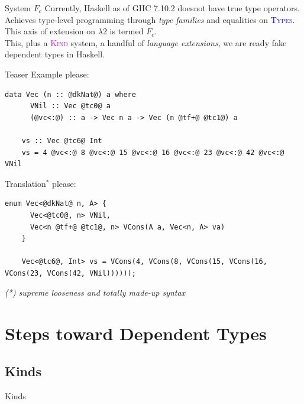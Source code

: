 \documentclass[xcolor={usenames,dvipsnames}]{beamer}
\newcommand{\htycon}[1]{\textcolor{Blue}{\textsc{#1}}}
\newcommand{\hkind}[1]{\textcolor{Fuchsia}{\textsc{#1}}}
\begin{document}
\begin{frame}[fragile]{System $F_c$}
  Currently, Haskell as of GHC 7.10.2 doesnot have true type operators.  Achieves type-level programming through \textit{type families} and equalities on \htycon{Types}.  This axis of extension on $\lambda2$ is termed  $F_c$.
  \ \\
  \pause
  This, plus a \hkind{Kind} system, a handful of \textit{language extensions}, we are ready fake dependent types in Haskell.
\end{frame}

\begin{frame}[fragile]{Teaser}
  Example please:
  \begin{lstlisting}[style=hask]
    data Vec (n :: @dkNat@) a where
      VNil :: Vec @tc0@ a
      (@vc<:@) :: a -> Vec n a -> Vec (n @tf+@ @tc1@) a

    vs :: Vec @tc6@ Int
    vs = 4 @vc<:@ 8 @vc<:@ 15 @vc<:@ 16 @vc<:@ 23 @vc<:@ 42 @vc<:@ VNil
  \end{lstlisting}

  \pause
  Translation$^*$ please:
  \begin{lstlisting}[style=hask]
    enum Vec<@dkNat@ n, A> {
      Vec<@tc0@, n> VNil,
      Vec<n @tf+@ @tc1@, n> VCons(A a, Vec<n, A> va)
    }

    Vec<@tc6@, Int> vs = VCons(4, VCons(8, VCons(15, VCons(16, VCons(23, VCons(42, VNil))))));
  \end{lstlisting}
  \textit{\tiny{(*) supreme looseness and totally made-up syntax}}
\end{frame}


\section{Steps toward Dependent Types}

\subsection{Kinds}
\begin{frame}[fragile]{Kinds}
\end{frame}


\end{document}
